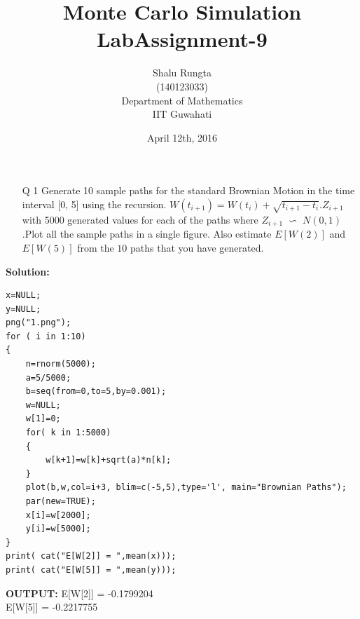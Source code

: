 \documentclass[12pt]{book}
\begin{document}
\title{\textbf{Monte Carlo Simulation Lab}}	
\title{\textbf{Assignment-9}}
\author{Shalu Rungta\\(140123033)\\Department of Mathematics\\IIT Guwahati}
\date{April 12th, 2016}

\maketitle

\newpage
\begin{enumerate}
\item[Q 1]  Generate 10 sample paths for the standard Brownian Motion in the time interval [0, 5] using the recursion.\newline
$W(t_{i+1})=W(t_i)+\sqrt{t_{i+1} - t_i}. Z_{i+1}$\newline
with 5000 generated values for each of the paths where $Z_{i+1}$ $ \backsim $ $N(0,1)$ .Plot all the sample paths in a single figure. Also estimate $E[W(2)]$ and $E[W(5)]$ from the $10$ paths
that you have generated.\\
\end{enumerate}
\textbf{Solution:}


\begin{lstlisting}
x=NULL;
y=NULL;
png("1.png");
for ( i in 1:10)
{
	n=rnorm(5000);
	a=5/5000;
	b=seq(from=0,to=5,by=0.001);
	w=NULL;
	w[1]=0;
	for( k in 1:5000)
	{
		w[k+1]=w[k]+sqrt(a)*n[k];
	}
	plot(b,w,col=i+3, blim=c(-5,5),type='l', main="Brownian Paths");
	par(new=TRUE);
	x[i]=w[2000];
	y[i]=w[5000];
}
print( cat("E[W[2]] = ",mean(x)));
print( cat("E[W[5]] = ",mean(y)));
\end{lstlisting}
\newpage
\textbf{OUTPUT:}
E[W[2]] = -0.1799204 \\ 
E[W[5]] = -0.2217755 \\

\begin{figure}[H]
	\centering
\end{figure}
\end{document}

